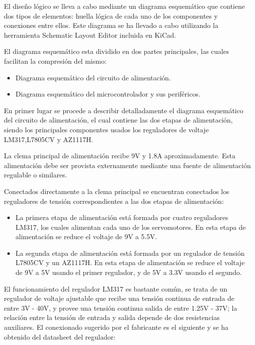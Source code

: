 El diseño lógico se lleva a cabo mediante un diagrama esquemático que contiene dos tipos de elementos: huella lógica de cada uno de los componentes y conexiones entre ellos. Este diagrama se ha llevado a cabo utilizando la herramienta Schematic Layout Editor incluida en KiCad.

El diagrama esquemático esta dividido en dos partes principales, las cuales facilitan la compresión del mismo:
\begin{itemize}
    \item Diagrama esquemático del circuito de alimentación.
    \item Diagrama esquemático del microcontrolador y sus periféricos.
\end{itemize}

En primer lugar se procede a describir detalladamente el diagrama esquemático del circuito de alimentación, el cual contiene las dos etapas de alimentación, siendo los principales componentes usados los reguladores de voltaje LM317,L7805CV y AZ1117H.

La clema principal de alimentación recibe 9V y 1.8A aproximadamente. Esta alimentación debe ser provista externamente mediante una fuente de alimentación regulable o similares. 

Conectados directamente a la clema principal se encuentran conectados los reguladores de tensión correspondientes a las dos etapas de alimentación:
\begin{itemize}
    \item La primera etapa de alimentación está formada por cuatro reguladores LM317, los cuales alimentan cada uno de los servomotores. En esta etapa de alimentación se reduce el voltaje de 9V a 5.5V.
    
    \item La segunda etapa de alimentación está formada por un regulador de tensión L7805CV y un AZ1117H. En esta etapa de alimentación se reduce el voltaje de 9V a 5V usando el primer regulador, y de 5V a 3.3V usando el segundo.
\end{itemize}

El funcionamiento del regulador LM317 es bastante común, se trata de un regulador de voltaje ajustable que recibe una tensión continua de entrada de entre 3V - 40V, y provee una tensión continua salida de entre 1.25V - 37V; la relación entre la tensión de entrada y salida depende de dos resistencias auxiliares. El conexionado sugerido por el fabricante es el siguiente y se ha obtenido del datasheet del regulador:

